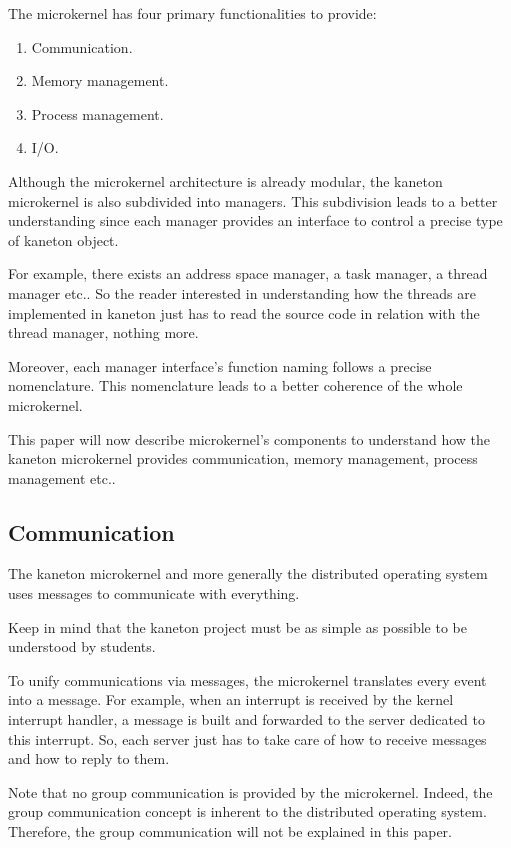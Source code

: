 \begin{multicols}{2}
The microkernel has four primary functionalities to provide:

\begin{enumerate}
  \item
    Communication.
  \item
    Memory management.
  \item
    Process management.
  \item
    I/O.
\end{enumerate}

Although the microkernel architecture is already modular, the kaneton
microkernel is also subdivided into managers. This subdivision leads to
a better understanding since each manager provides an interface to control
a precise type of kaneton object.

For example, there exists an address space manager, a task manager,
a thread manager etc.. So the reader interested in understanding how
the threads are implemented in kaneton just has to read the source code
in relation with the thread manager, nothing more.

Moreover, each manager interface's function naming follows a precise
nomenclature. This nomenclature leads to a better coherence of the whole
microkernel.

This paper will now describe microkernel's components to understand how
the kaneton microkernel provides communication, memory management, process
management etc..

%
%

\subsection{Communication}

The kaneton microkernel and more generally the distributed operating
system uses messages to communicate with everything.

Keep in mind that the kaneton project must be as simple as possible to be
understood by students.

To unify communications via messages, the microkernel translates every event
into a message. For example, when an interrupt is received by the kernel
interrupt handler, a message is built and forwarded to the server dedicated
to this interrupt. So, each server just has to take care of how to receive
messages and how to reply to them.

Note that no group communication is provided by the microkernel. Indeed, the
group communication concept is inherent to the distributed operating system.
Therefore, the group communication will not be explained in this paper.


\end{multicols}
